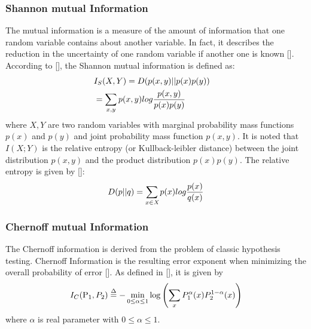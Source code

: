 \documentclass[conference]{IEEEtran}
\begin{document}
\subsubsection{Shannon mutual Information}
The mutual information is a measure of the amount of information that one random variable contains about another variable. In fact, it describes the reduction in the uncertainty of one random variable if another one is known [\cite{Elements}].
According to [\cite{Elements}], the Shannon mutual information is defined as:
\begin{equation}\label{Shannon Information}
\begin{aligned}
  & I_S(X,Y) = D(p(x,y)||p(x)p(y))  \cr
  &  = \sum\limits_{x,y} {p(x,y)log{{p(x,y)} \over {p(x)p(y)}}}  \cr
 \end{aligned}
\end{equation}
where $X,Y$ are two random variables with marginal probability mass functions $p(x)$ and $p(y)$ and joint probability mass function $p(x,y)$. It is noted that $I(X;Y)$ is the relative entropy (or Kullback-leibler distance) between the joint distribution $p(x,y)$ and the product distribution $p(x)p(y)$. The relative entropy is given by [\cite{Elements}]:
\begin{equation}\label{KL distance}
D(p||q) = \sum\limits_{x \in \textit{X}} {p(x)log{{p(x)} \over {q(x)}}}
\end{equation}

\subsubsection{Chernoff mutual Information}
The Chernoff information is derived from the problem of classic hypothesis testing. Chernoff Information is the resulting error exponent when minimizing the overall probability of error [\cite{Elements}]. As defined in [\cite{Elements}], it is given by
\begin{equation}\label{Chernoff Information1}
\begin{aligned}
  I_C({{\rm{P}}_1},{P_2}) \buildrel \Delta \over =  - \mathop {\min }\limits_{0 \le \alpha  \le 1} \log \left( {\sum\limits_x {P_1^\alpha (x)P_2^{1 - \alpha }(x)} } \right)
 \end{aligned}
\end{equation}
where $\alpha$ is real parameter with $0\leq \alpha \leq 1$.
\end{document}
